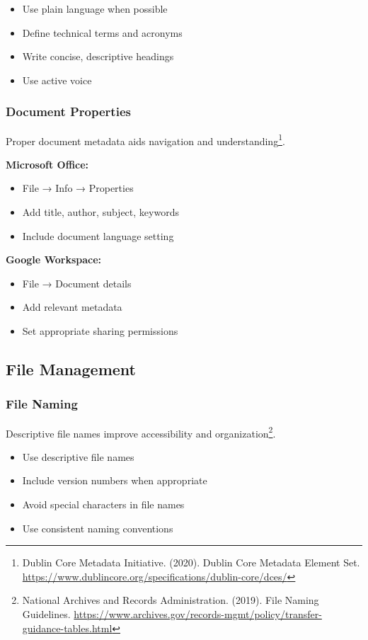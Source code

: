 \begin{itemize}
\item Use plain language when possible
\item Define technical terms and acronyms
\item Write concise, descriptive headings
\item Use active voice
\end{itemize}

\subsubsection{Document Properties}
Proper document metadata aids navigation and understanding\footnote{Dublin Core Metadata Initiative. (2020). Dublin Core Metadata Element Set. \url{https://www.dublincore.org/specifications/dublin-core/dces/}}.

\textbf{Microsoft Office:}
\begin{itemize}
\item File → Info → Properties
\item Add title, author, subject, keywords
\item Include document language setting
\end{itemize}

\textbf{Google Workspace:}
\begin{itemize}
\item File → Document details
\item Add relevant metadata
\item Set appropriate sharing permissions
\end{itemize}

\subsection{File Management}

\subsubsection{File Naming}
Descriptive file names improve accessibility and organization\footnote{National Archives and Records Administration. (2019). File Naming Guidelines. \url{https://www.archives.gov/records-mgmt/policy/transfer-guidance-tables.html}}.

\begin{itemize}
\item Use descriptive file names
\item Include version numbers when appropriate
\item Avoid special characters in file names
\item Use consistent naming conventions
\end{itemize}

